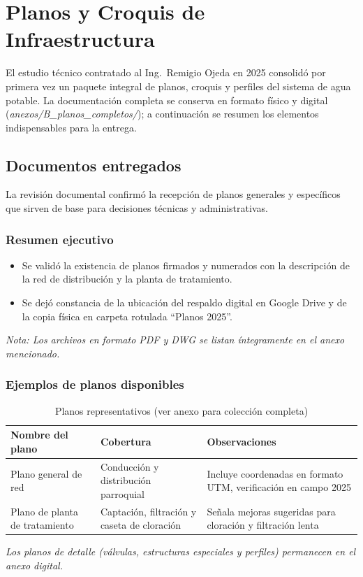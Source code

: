\chapter{Planos y Croquis de Infraestructura}

El estudio técnico contratado al Ing.\ Remigio Ojeda en 2025 consolidó por primera vez un paquete integral de planos, croquis y perfiles del sistema de agua potable. La documentación completa se conserva en formato físico y digital (\emph{anexos/B\_planos\_completos/}); a continuación se resumen los elementos indispensables para la entrega.

\section{Documentos entregados}

La revisión documental confirmó la recepción de planos generales y específicos que sirven de base para decisiones técnicas y administrativas.

\subsection*{Resumen ejecutivo}
\begin{itemize}[noitemsep, topsep=0pt]
  \item Se validó la existencia de planos firmados y numerados con la descripción de la red de distribución y la planta de tratamiento.
  \item Se dejó constancia de la ubicación del respaldo digital en Google Drive y de la copia física en carpeta rotulada ``Planos 2025''.
\end{itemize}
\textit{Nota: Los archivos en formato PDF y DWG se listan íntegramente en el anexo mencionado.}

\subsection*{Ejemplos de planos disponibles}
\begin{table}[H]
\centering
\caption{Planos representativos (ver anexo para colección completa)}
\label{tab:planos_representativos}
\begin{tabular}{p{4.5cm} p{5.2cm} p{4cm}}
\toprule
\textbf{Nombre del plano} & \textbf{Cobertura} & \textbf{Observaciones} \\
\midrule
Plano general de red & Conducción y distribución parroquial & Incluye coordenadas en formato UTM, verificación en campo 2025 \\
Plano de planta de tratamiento & Captación, filtración y caseta de cloración & Señala mejoras sugeridas para cloración y filtración lenta \\
\bottomrule
\end{tabular}
\end{table}
\textit{Los planos de detalle (válvulas, estructuras especiales y perfiles) permanecen en el anexo digital.}


